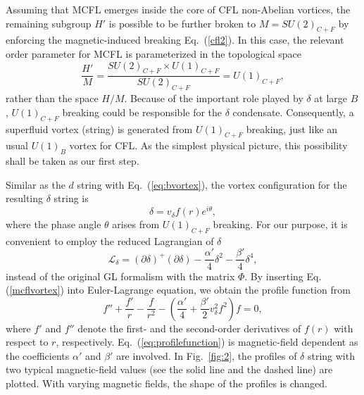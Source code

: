 \documentclass[prd, showpacs,nofootinbib,amsmath,amssymb]{revtex4}
\begin{document}
Assuming that MCFL emerges inside the core of CFL non-Abelian vortices, the remaining subgroup $H'$ is
possible to be further broken to $M =SU(2)_{C+F}$ by enforcing the magnetic-induced breaking Eq.~(\ref{cfl2}).
In this case, the relevant order parameter for MCFL is parameterized in the topological space
\begin{equation}
  \label{eq:mcfsymm}
 \frac{H'}{M} = \frac{SU(2)_{C+F} \times U(1)_{C+F}}{SU(2)_{C+F}} = U(1)_{C+F},
\end{equation}
rather than the space $H/M$.
Because of the important role played by $\delta$ at large $B$, $U(1)_{C+F}$
breaking could be responsible for the $\delta$ condensate. Consequently, a superfluid vortex (string) is generated from $U(1)_{C+F}$ breaking, just like an usual $U(1)_B$ vortex for CFL. As the simplest
physical picture, this possibility shall be taken as our first step.

Similar as the $d$ string with Eq.~(\ref{eq:bvortex}), the vortex configuration for the resulting $\delta$
string is
\begin{equation}
	\delta= v_\delta f(r) e^{i\theta},\label{mcflvortex}
\end{equation}
where the phase angle $\theta$ arises from $U(1)_{C+F}$ breaking.
For our purpose, it is convenient to employ the reduced Lagrangian of $\delta$
\begin{equation}
\label{eq:mcflvorticehamilton}
 \mathcal{L}_\delta = (\partial \delta)^+ (\partial \delta) - \frac{\alpha'}{4}\delta^2 - \frac{\beta'}{4}\delta^4,
\end{equation}
instead of the original GL formalism with the matrix $\Phi$.
By inserting Eq.(\ref{mcflvortex}) into Euler-Lagrange equation, we obtain the profile function from
\begin{equation}
\label{eq:profilefunction}
 f'' + \frac{f'}{r} -\frac{f}{r^2} - (\frac{\alpha'}{4} + \frac{\beta'}{2} v_\delta^2 f^2)f=0,
\end{equation}
where $f'$ and $f''$ denote the first- and the second-order derivatives of $f(r)$ with respect to $r$,
respectively. Eq.~(\ref{eq:profilefunction}) is magnetic-field dependent as the coefficients $\alpha'$
and $\beta'$ are involved.
In Fig.~\ref{fig:2}, the profiles of $\delta$ string with two typical magnetic-field values (see the
solid line and the dashed line) are plotted. With varying magnetic fields, the shape of the profiles
is changed.
\end{document}
